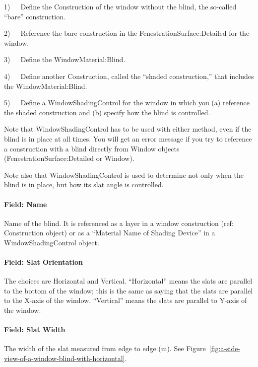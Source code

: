 1)~~~Define the Construction of the window without the blind, the so-called ``bare'' construction.

2)~~~Reference the bare construction in the FenestrationSurface:Detailed for the window.

3)~~~Define the WindowMaterial:Blind.

4)~~~Define another Construction, called the ``shaded construction,'' that includes the WindowMaterial:Blind.

5)~~~Define a WindowShadingControl for the window in which you (a) reference the shaded construction and (b) specify how the blind is controlled.

Note that WindowShadingControl has to be used with either method, even if the blind is in place at all times. You will get an error message if you try to reference a construction with a blind directly from Window objects (FenestrationSurface:Detailed or Window).

Note also that WindowShadingControl is used to determine not only when the blind is in place, but how its slat angle is controlled.

\paragraph{Field: Name}\label{field-name-17-007}

Name of the blind. It is referenced as a layer in a window construction (ref: Construction object) or as a ``Material Name of Shading Device'' in a WindowShadingControl object.

\paragraph{Field: Slat Orientation}\label{field-slat-orientation}

The choices are Horizontal and Vertical. ``Horizontal'' means the slats are parallel to the bottom of the window; this is the same as saying that the slats are parallel to the X-axis of the window. ``Vertical'' means the slats are parallel to Y-axis of the window.

\paragraph{Field: Slat Width}\label{field-slat-width}

The width of the slat measured from edge to edge (m). See Figure~\ref{fig:a-side-view-of-a-window-blind-with-horizontal}.

